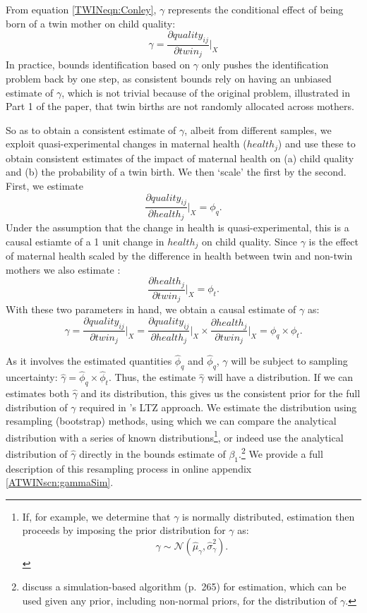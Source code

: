 \documentclass[subeqn]{article}
\begin{document}
\begin{spacing}{1.4}
From equation \ref{TWINeqn:Conley}, $\gamma$ represents the conditional effect
of being born of a twin mother on child quality:
\[
\gamma=\frac{\partial quality_{ij}}{\partial twin_j}\bigg|_{X}
\]
In practice, bounds identification based on $\gamma$ only pushes the
identification problem back by one step, as consistent bounds rely on having
an unbiased estimate of $\gamma$, which is not trivial because of the original problem, illustrated in Part 1 of the paper, that twin births are not randomly allocated across mothers.

So as to obtain a consistent estimate of $\gamma$, albeit from different samples, we exploit quasi-experimental changes in maternal health ($health_j$) and use these to obtain consistent estimates of the impact of maternal health on (a) child quality and (b) the probability of a twin birth. We then `scale' the first by the second. First, we estimate
\[
\frac{\partial quality_{ij}}{\partial health_j}\bigg|_{X}=\phi_q.
\]
Under the assumption that the change in health is quasi-experimental, this is a causal estiamte of a 1 unit change in $health_j$ on child quality. Since $\gamma$ is the effect of maternal health scaled by the difference in health between twin and non-twin mothers we also estimate :
\[
\frac{\partial health_j}{\partial twin_j}\bigg|_{X}=\phi_t.\]
With these two parameters in hand, we obtain a causal estimate of $\gamma$ as:
\begin{equation}
  \gamma=\frac{\partial quality_{ij}}{\partial twin_j}\bigg|_{X} = \frac{\partial quality_{ij}}{\partial health_j}\bigg|_{X} \times \frac{\partial health_j}{\partial twin_j}\bigg|_{X} =\phi_q\times\phi_t.
\end{equation}

As it involves the estimated quantities $\hat\phi_q$ and $\hat\phi_q$, $\gamma$ will be subject to sampling uncertainty:
$\hat\gamma = \hat\phi_q\times \hat\phi_t$.  Thus, the estimate $\hat\gamma$ will
have a distribution.  If we can estimates both $\hat\gamma$ and its distribution,
this gives us the consistent prior for the full distribution of $\gamma$ required
in \citeauthor{Conleyetal2012}'s LTZ approach. We estimate the distribution using resampling (bootstrap)
methods, using which we can compare the analytical distribution with a series of known
distributions\footnote{If, for example, we determine that $\gamma$ is normally
  distributed, estimation then proceeds by imposing the prior distribution for
  $\gamma$ as:
  \begin{equation}
    \label{TWINeqn:ltz}
    \gamma \sim \mathcal{N}(\hat\mu_\gamma,\hat\sigma^2_\gamma).
  \end{equation}
}, or indeed use the analytical distribution of $\hat\gamma$ directly in the
bounds estimate of $\beta_1$.\footnote{\citet{Conleyetal2012} discuss a
  simulation-based algorithm (p.\ 265) for estimation, which can be used given
  any prior, including non-normal priors, for the distribution of $\gamma$.}
We provide a full description of this resampling process in online appendix
\ref{ATWINscn:gammaSim}. 


\end{spacing}
\end{document}
